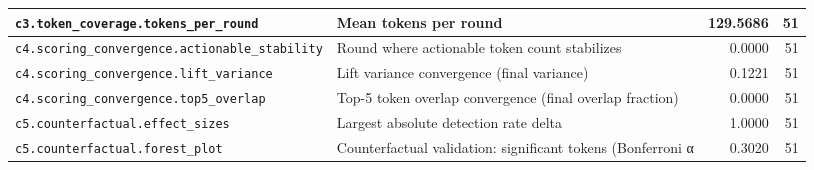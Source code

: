 \begin{table}[htbp]
\begin{tabular}{llrr}
\texttt{c3.token\_coverage.tokens\_per\_round} & Mean tokens per round & 129.5686 & 51 \\
\midrule
\texttt{c4.scoring\_convergence.actionable\_stability} & Round where actionable token count stabilizes & 0.0000 & 51 \\
\texttt{c4.scoring\_convergence.lift\_variance} & Lift variance convergence (final variance) & 0.1221 & 51 \\
\texttt{c4.scoring\_convergence.top5\_overlap} & Top-5 token overlap convergence (final overlap fraction) & 0.0000 & 51 \\
\midrule
\texttt{c5.counterfactual.effect\_sizes} & Largest absolute detection rate delta & 1.0000 & 51 \\
\texttt{c5.counterfactual.forest\_plot} & Counterfactual validation: significant tokens (Bonferroni α & 0.3020 & 51 \\
\bottomrule
\end{tabular}
\end{table}
